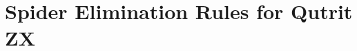 \documentclass[submission,copyright,creativecommons]{eptcs}
\begin{document}



\appendix



\section{Spider Elimination Rules for Qutrit ZX}




\end{document}
